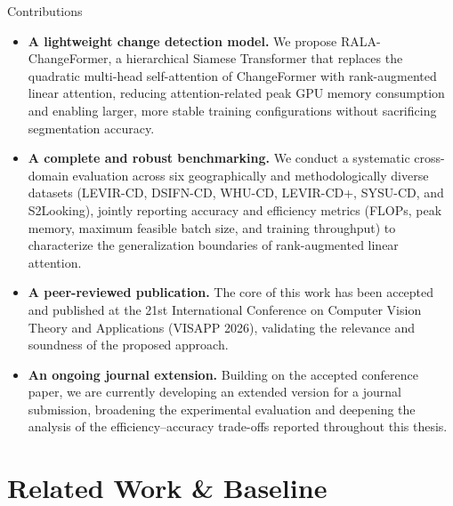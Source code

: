 \documentclass[aspectratio=169]{beamer}
\begin{document}
\begin{frame}{Contributions}
\begin{itemize}
    \item \textbf{A lightweight change detection model.} We propose RALA-ChangeFormer, a hierarchical Siamese Transformer that replaces the quadratic multi-head self-attention of ChangeFormer with rank-augmented linear attention, reducing attention-related peak GPU memory consumption and enabling larger, more stable training configurations without sacrificing segmentation accuracy.
    \item \textbf{A complete and robust benchmarking.} We conduct a systematic cross-domain evaluation across six geographically and methodologically diverse datasets (LEVIR-CD, DSIFN-CD, WHU-CD, LEVIR-CD+, SYSU-CD, and S2Looking), jointly reporting accuracy and efficiency metrics (FLOPs, peak memory, maximum feasible batch size, and training throughput) to characterize the generalization boundaries of rank-augmented linear attention.
    \item \textbf{A peer-reviewed publication.} The core of this work has been accepted and published at the 21st International Conference on Computer Vision Theory and Applications (VISAPP 2026), validating the relevance and soundness of the proposed approach.
    \item \textbf{An ongoing journal extension.} Building on the accepted conference paper, we are currently developing an extended version for a journal submission, broadening the experimental evaluation and deepening the analysis of the efficiency--accuracy trade-offs reported throughout this thesis.
\end{itemize}
\end{frame}

\section{Related Work \& Baseline}
\end{document}
